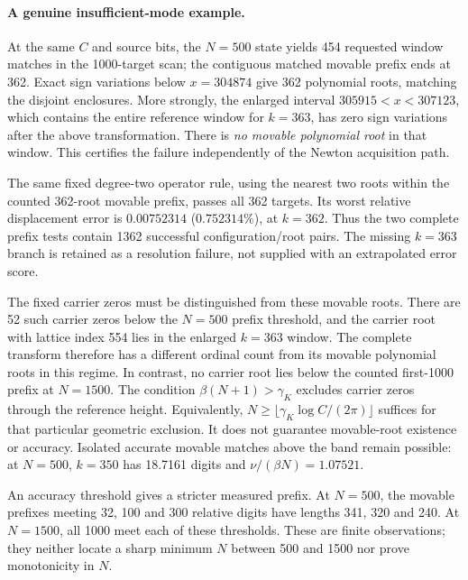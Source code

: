 \paragraph{A genuine insufficient-mode example.}
At the same $C$ and source bits, the $N=500$ state yields 454 requested
window matches in the 1000-target scan; the contiguous matched movable
prefix ends at 362. Exact sign variations below $x=304874$ give 362
polynomial roots, matching the disjoint enclosures. More strongly, the
enlarged interval $305915<x<307123$, which contains the entire reference
window for $k=363$, has zero sign variations after the above transformation.
There is \emph{no movable polynomial root} in that window. This certifies
the failure independently of the Newton acquisition path.

The same fixed degree-two operator rule, using the nearest two roots
within the counted 362-root movable prefix, passes all 362 targets. Its
worst relative displacement error is $0.00752314$ ($0.752314\%$), at
$k=362$. Thus the two complete prefix tests contain 1362 successful
configuration/root pairs. The missing $k=363$ branch is retained as a
resolution failure, not supplied with an extrapolated error score.

The fixed carrier zeros must be distinguished from these movable roots.
There are 52 such carrier zeros below the $N=500$ prefix threshold, and
the carrier root with lattice index 554 lies in the enlarged $k=363$
window. The complete transform therefore has a different ordinal count
from its movable polynomial roots in this regime. In contrast, no carrier
root lies below the counted first-1000 prefix at $N=1500$.
The condition $\beta(N+1)>\gamma_K$ excludes carrier zeros through the
reference height. Equivalently, $N\ge\lfloor\gamma_K\log C/(2\pi)\rfloor$
suffices for that particular geometric exclusion. It does not guarantee
movable-root existence or accuracy. Isolated accurate movable matches
above the band remain possible: at $N=500$, $k=350$ has 18.7161 digits
and $\nu/(\beta N)=1.07521$.

An accuracy threshold gives a stricter measured prefix. At $N=500$, the
movable prefixes meeting 32, 100 and 300 relative digits have lengths
341, 320 and 240. At $N=1500$, all 1000 meet each of these thresholds.
These are finite observations; they neither locate a sharp minimum $N$
between 500 and 1500 nor prove monotonicity in $N$.

